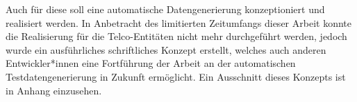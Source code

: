 Auch für diese soll eine automatische Datengenerierung konzeptioniert und realisiert werden. In Anbetracht des limitierten Zeitumfangs dieser Arbeit konnte die Realisierung für die Telco-Entitäten nicht mehr durchgeführt werden, jedoch wurde ein ausführliches schriftliches Konzept erstellt, welches auch anderen Entwickler*innen eine Fortführung der Arbeit an der automatischen Testdatengenerierung in Zukunft ermöglicht. Ein Ausschnitt dieses Konzepts ist in Anhang  einzusehen.